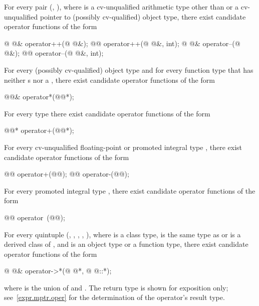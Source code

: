 \pnum
For every pair
(,
),
where
is a cv-unqualified arithmetic type other than 
or a cv-unqualified pointer to (possibly cv-qualified) object type,
there exist candidate operator functions of the form
\begin{codeblock}
@ @& operator++(@ @&);
@@ operator++(@ @&, int);
@ @& operator--(@ @&);
@@ operator--(@ @&, int);
\end{codeblock}

\pnum
For every (possibly cv-qualified) object type  and
for every function type 
that has neither s nor a ,
there exist candidate operator functions of the form
\begin{codeblock}
@@&    operator*(@@*);
\end{codeblock}

\pnum
For every type  there exist candidate operator functions of the form
\begin{codeblock}
@@*    operator+(@@*);
\end{codeblock}

\pnum
For every cv-unqualified floating-point or promoted integral type ,
there exist candidate operator functions of the form
\begin{codeblock}
@@ operator+(@@);
@@ operator-(@@);
\end{codeblock}

\pnum
For every promoted integral type
,
there exist candidate operator functions of the form
\begin{codeblock}
@@ operator~(@@);
\end{codeblock}

\pnum
For every quintuple
(,
,
,
,
),
where
is a class type,
is the same type as  or is a derived class of , and
is an object type or a function type,
there exist candidate operator functions of the form
\begin{codeblock}
@ @& operator->*(@ @*, @ @::*);
\end{codeblock}
where  is the union of  and .
The return type is shown for exposition only; see~\ref{expr.mptr.oper} for the
determination of the operator's result type.

